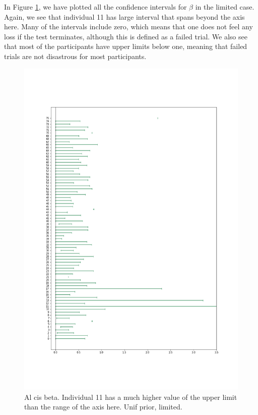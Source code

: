 In Figure \ref{fig:all_cis_beta}, we have plotted all the confidence intervals for $\beta$ in the limited case. Again, we see that individual 11 has  large interval that spans beyond the axis here. Many of the intervals include zero, which means that one does not feel any loss if the test terminates, although this is defined as a failed trial. We also see that most of the participants have upper limits below one, meaning that failed trials are not disastrous for most participants. 
\begin{figure}
    \centering
    \includegraphics[scale=0.38]{pictures/all_cis_lim_beta.png}
    \caption{Al cis beta. Individual 11 has a much higher value of the upper limit than the range of the axis here. Unif prior, limited.}
    \label{fig:all_cis_beta}
\end{figure}

